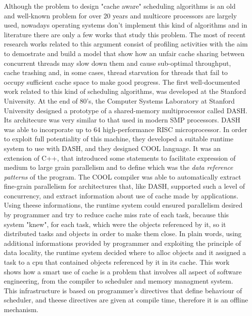 Although the problem to design "cache aware" scheduling algorithms is an old and well-known problem for over 20 years and multicore processors are 
largely used, nowadays operating systems don't implement this kind of algorithms and in literature there are only a few works that study this problem. 
The most of recent research works related to this argument consist of profiling activities with the aim to demostrate and build a model that show how
an unfair cache sharing between concurrent threads may slow down them and cause sub-optimal throughput, cache trashing and, in some cases, thread 
starvation for threads that fail to occupy sufficient cache space to make good progress.
The first well-documented work related to this kind of scheduling algorithms, was developed at the Stanford University.
At the end of 80's, the Computer Systems Laboratory at Stanford University designed a prototype of a shared-memory multiprocessor called DASH. 
Its architecure was very similar to that used in modern SMP processors. DASH was able to incorporate up to 64 high-performance RISC microprocessor. 
In order to exploit full potentiality of this machine, they developed a suitable runtime system to use with DASH, and they designed COOL language. 
It was an extension of C++, that introduced some statements to facilitate expression of medium to large grain parallelism and to define which was the 
\textit{data reference patterns} of the program.
The COOL compiler was able to automatically extract fine-grain parallelism for architectures that, like DASH, supported such a level of concurrency,
and extract information about use of cache made by applications. Using theese informations, the runtime system could ensured parallelism desired by 
programmer and try to reduce cache miss rate of each task, because this system "knew", for each task, which were the objects referenced by it, so 
it distributed tasks and objects in order to make them close.
In plain words, using additional informations provided by programmer and exploiting the principle of data locality, the runtime system decided where to 
alloc objects and it assigned a task to a cpu that contained objects referenced by it in its cache. This work shows how a smart use of cache is a 
problem that involves all aspect of software engineering, from the compiler to scheduler and memory managment system.
This infrastructure is based on programmer's directives that define behaviour of scheduler, and theese directives are given at compile time, therefore 
it is an offline mechanism.

